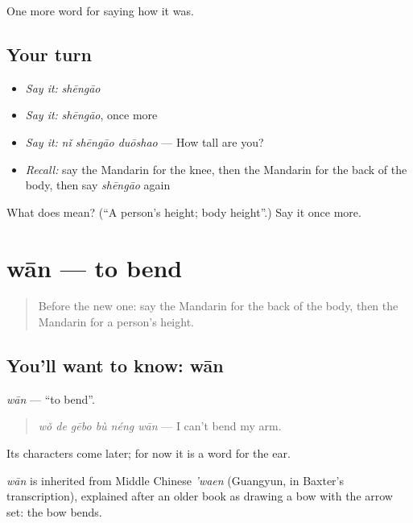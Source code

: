 \begin{grammarlens}[title={What you've built}]
One more word for saying how it was.
\end{grammarlens}

\subsection*{Your turn}
\begin{itemize}
\raggedright
  \item \emph{Say it:} \emph{shēngāo}
  \item \emph{Say it:} \emph{shēngāo}, once more
  \item \emph{Say it:} \emph{nǐ shēngāo duōshao} — How tall are you?
  \item \emph{Recall:} say the Mandarin for the knee, then the Mandarin for the back of the body, then say \emph{shēngāo} again
\end{itemize}

\begin{tcolorbox}[breakable,colback=teal!4,colframe=teal!35!black,title={Before you move on}]
What does  mean? (\textquotedblleft{}A person's height; body height\textquotedblright{}.) Say it once more.
\end{tcolorbox}
\section[wān]{wān — to bend}

\label{lesson:ZH-C475-wan-bend}



\begin{quote}
Before the new one: say the Mandarin for the back of the body, then the Mandarin for a person's height.
\end{quote}

\subsection*{You'll want to know: wān}
\emph{wān} — \textquotedblleft{}to bend\textquotedblright{}.

\begin{quote}
\emph{wǒ de gēbo bù néng wān} — I can't bend my arm.
\end{quote}

Its characters come later; for now it is a word for the ear.

\begin{cousinweb}
\emph{wān} is inherited from Middle Chinese \emph{'waen} (Guangyun, in Baxter's transcription), explained after an older book as drawing a bow with the arrow set: the bow bends.
\end{cousinweb}

